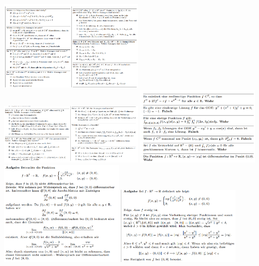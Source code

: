 \documentclass[8pt]{extarticle}
\begin{document}
\begin{multicols*}{3}
\begin{center}
  \includegraphics[width=7cm]{multiplechoice1.png} 
  \includegraphics[width=7cm]{multiplechoice2.png} 
  \includegraphics[width=6cm]{multiplechoice3.png} 
  \includegraphics[width=6cm]{ex1.png} 
  \includegraphics[width=6cm]{ex2.png} 
\end{center}



\end{multicols*}
\end{document}
